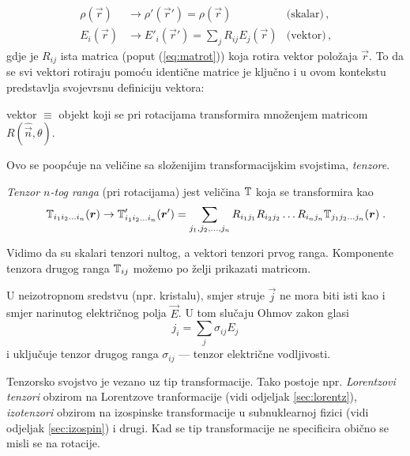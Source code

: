 \vspace*{2ex}
\centerline{}

\begin{align*}
    \rho(\vec{r}) &\to \rho'(\vec{r}') = \rho(\vec{r}) \qquad &\textrm{(skalar)} \,, \\
    E_i(\vec{r}) &\to E'_i(\vec{r}') = \sum_j R_{ij}E_j(\vec{r}) 
                 &\textrm{(vektor)} \,,
\end{align*}
gdje je $R_{ij}$ ista matrica (poput (\ref{eq:matrot})) koja rotira
vektor položaja $\vec{r}$. To da se svi vektori rotiraju pomoću identične
matrice je ključno i u ovom kontekstu predstavlja svojevrsnu definiciju
vektora:
\begin{center}
    {vektor} $\equiv$ {objekt koji se pri rotacijama transformira množenjem matricom}
    $R(\hat{\vec{n}}, \theta)$.
\end{center}
Ovo se poopćuje na veličine sa složenijim transformacijskim svojstima,
\emph{tenzore}. 
\begin{definicija}[Tenzor]
\label{def:tenzor}
\emph{Tenzor $n$-tog ranga} (pri rotacijama)  jest veličina $\mathbb{T}$  koja
se transformira kao
\begin{equation}
 \qquad \bbtensor{T}_{i_1 i_2 \ldots i_n}(\vec{r}) \to \bbtensor{T}'_{i_1 i_2 \ldots i_n}(\vec{r}') =
\sum_{j_1, j_2, \ldots, j_n}
  R_{i_1 j_1}  R_{i_2 j_2} \ldots  R_{i_n j_n} \bbtensor{T}_{j_1 j_2 \ldots j_n}(\vec{r})
 \; . 
 \label{eq:tenzor}
\end{equation}
\end{definicija}

Vidimo da su skalari tenzori nultog, a vektori tenzori prvog ranga.
Komponente tenzora drugog ranga $\mathbb{T}_{ij}$
možemo po želji prikazati matricom.

\begin{primjer}
U neizotropnom sredstvu (npr. kristalu), smjer struje $\vec{j}$ ne mora biti isti
kao i smjer narinutog električnog polja $\vec{E}$. U tom slučaju Ohmov zakon
glasi
\begin{equation*}
j_i = \sum_j \sigma_{ij} E_j
\end{equation*}
i uključuje tenzor drugog ranga $\sigma_{ij}$ --- tenzor električne vodljivosti.
\label{pr:tenzorvodljivosti}
\end{primjer}

Tenzorsko svojstvo je vezano uz tip transformacije. Tako postoje
npr. \emph{Lorentzovi tenzori} obzirom na Lorentzove tranformacije
(vidi odjeljak \ref{sec:lorentz}), \emph{izotenzori} obzirom na
izospinske transformacije u subnuklearnoj fizici (vidi odjeljak
\ref{sec:izospin}) i drugi.
Kad se tip transformacije ne specificira obično se misli se na rotacije.

